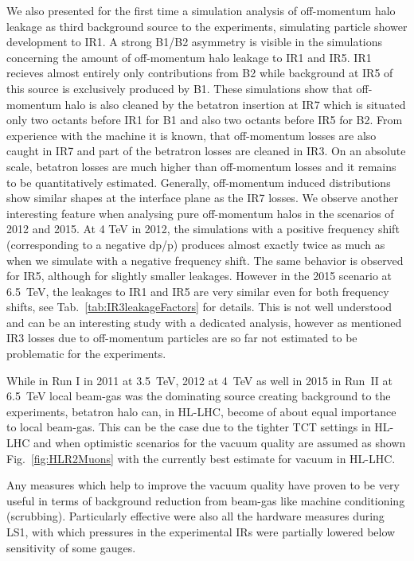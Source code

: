 We also presented for the first time a simulation analysis of off-momentum halo leakage as third background source to the experiments, simulating particle shower development to IR1. A strong B1/B2 asymmetry is visible in the simulations concerning the amount of off-momentum halo leakage to IR1 and IR5. IR1 recieves almost entirely only contributions from B2 while background at IR5 of this source is exclusively produced by B1. These simulations show that off-momentum halo is also cleaned by the betatron insertion at IR7 which is situated only two octants before IR1 for B1 and also two octants before IR5 for B2. From experience with the machine it is known, that off-momentum losses are also caught in IR7 and part of the betratron losses are cleaned in IR3. On an absolute scale, betatron losses are much higher than off-momentum losses and it remains to be quantitatively estimated.
Generally, off-momentum induced distributions show similar shapes at the interface plane as the IR7 losses. We observe another interesting feature when analysing pure off-momentum halos in the scenarios of 2012 and 2015. At 4 TeV in 2012, the simulations with a positive frequency shift (corresponding to a negative dp/p) produces almost exactly twice as much as when we simulate with a negative frequency shift. The same behavior is observed for IR5, although for slightly smaller leakages. However in the 2015 scenario at 6.5~TeV, the leakages to IR1 and IR5 are very similar even for both frequency shifts, see Tab.~\ref{tab:IR3leakageFactors} for details. This is not well understood and can be an interesting study with a dedicated analysis, however as mentioned IR3 losses due to off-momentum particles are so far not estimated to be problematic for the experiments. 


While in Run I in 2011 at 3.5~TeV, 2012 at 4~TeV as well in 2015 in Run~II at 6.5~TeV local beam-gas was the dominating source creating background to the experiments, betatron halo can, in HL-LHC, become of about equal importance to local beam-gas. This can be the case due to the tighter TCT settings in HL-LHC and when optimistic scenarios for the vacuum quality are assumed as shown Fig.~\ref{fig:HLR2Muons} with the currently best estimate for vacuum in HL-LHC. 


Any measures which help to improve the vacuum quality have proven to be very useful in terms of background reduction from beam-gas like machine conditioning (scrubbing). Particularly effective were also all the hardware measures during LS1, with which pressures in the experimental IRs were partially lowered below sensitivity of some gauges.


